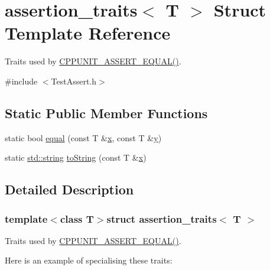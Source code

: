\hypertarget{structassertion__traits}{\section{assertion\-\_\-traits$<$ T $>$ Struct Template Reference}
\label{structassertion__traits}
}


Traits used by \hyperlink{_test_assert_8h_a71162f05be07ef6817d156e77c68b1a3}{C\-P\-P\-U\-N\-I\-T\-\_\-\-A\-S\-S\-E\-R\-T\-\_\-\-E\-Q\-U\-A\-L()}.  




{\ttfamily \#include $<$Test\-Assert.\-h$>$}

\subsection*{Static Public Member Functions}
\begin{DoxyCompactItemize}
\item 
static bool \hyperlink{structassertion__traits_a287c07a4e171256a0128201c7e4c4228}{equal} (const T \&\hyperlink{glew_8h_ad77deca22f617d3f0e0eb786445689fc}{x}, const T \&\hyperlink{glew_8h_a9298c7ad619074f5285b32c6b72bfdea}{y})
\item 
static \hyperlink{glew_8h_ae84541b4f3d8e1ea24ec0f466a8c568b}{std\-::string} \hyperlink{structassertion__traits_a1c96296fb44902b4f22d99b9c3cc7749}{to\-String} (const T \&\hyperlink{glew_8h_ad77deca22f617d3f0e0eb786445689fc}{x})
\end{DoxyCompactItemize}


\subsection{Detailed Description}
\subsubsection*{template$<$class T$>$struct assertion\-\_\-traits$<$ T $>$}

Traits used by \hyperlink{_test_assert_8h_a71162f05be07ef6817d156e77c68b1a3}{C\-P\-P\-U\-N\-I\-T\-\_\-\-A\-S\-S\-E\-R\-T\-\_\-\-E\-Q\-U\-A\-L()}. 

Here is an example of specialising these traits\-:


